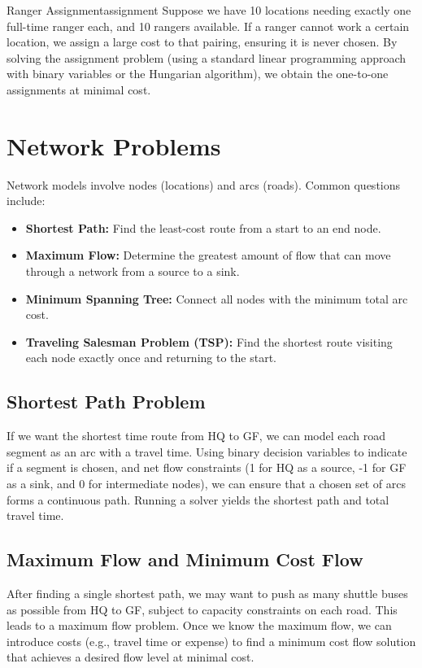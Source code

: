 \begin{example}{Ranger Assignment}{assignment}
Suppose we have 10 locations needing exactly one full-time ranger each, and 10 rangers available. If a ranger cannot work a certain location, we assign a large cost to that pairing, ensuring it is never chosen. By solving the assignment problem (using a standard linear programming approach with binary variables or the Hungarian algorithm), we obtain the one-to-one assignments at minimal cost.
\end{example}

\section{Network Problems}
Network models involve nodes (locations) and arcs (roads). Common questions include:

\begin{itemize}
  \item \textbf{Shortest Path:} Find the least-cost route from a start to an end node.
  \item \textbf{Maximum Flow:} Determine the greatest amount of flow that can move through a network from a source to a sink.
  \item \textbf{Minimum Spanning Tree:} Connect all nodes with the minimum total arc cost.
  \item \textbf{Traveling Salesman Problem (TSP):} Find the shortest route visiting each node exactly once and returning to the start.
\end{itemize}

\subsection{Shortest Path Problem}
If we want the shortest time route from HQ to GF, we can model each road segment as an arc with a travel time. Using binary decision variables to indicate if a segment is chosen, and net flow constraints (1 for HQ as a source, -1 for GF as a sink, and 0 for intermediate nodes), we can ensure that a chosen set of arcs forms a continuous path. Running a solver yields the shortest path and total travel time.

\subsection{Maximum Flow and Minimum Cost Flow}
After finding a single shortest path, we may want to push as many shuttle buses as possible from HQ to GF, subject to capacity constraints on each road. This leads to a maximum flow problem. Once we know the maximum flow, we can introduce costs (e.g., travel time or expense) to find a minimum cost flow solution that achieves a desired flow level at minimal cost.


